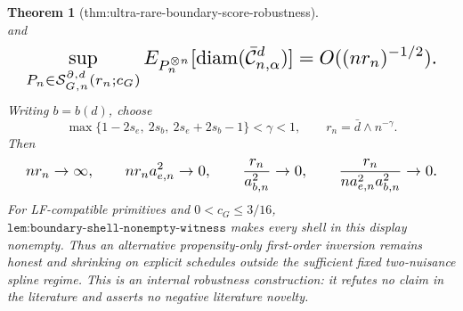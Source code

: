 \documentclass{article}
\newtheorem{theorem}{Theorem}
\begin{document}
\begin{theorem}[thm:ultra-rare-boundary-score-robustness]
\[\]
and
\[
\makebox[\linewidth][c]{\resizebox{0.98\linewidth}{!}{\par\noindent \makebox[\linewidth][c]{\resizebox{0.98\linewidth}{!}{\(\displaystyle \displaystyle \sup_{P_n\in\mathcal S_{G,n}^{\partial,d}(r_n;c_G)}E_{P_n^{\otimes n}}[\operatorname{diam}(\bar{\mathcal C}_{n,\alpha}^d)]=O((nr_n)^{-1/2}).\)}}\par\noindent}}
\]
Writing \(b=b(d)\), choose
\[\max\{1-2s_e,\ 2s_b,\ 2s_e+2s_b-1\}<\gamma<1,\qquad r_n=\bar d\wedge n^{-\gamma}.\]
Then
\[
\makebox[\linewidth][c]{\resizebox{0.98\linewidth}{!}{\par\noindent \makebox[\linewidth][c]{\resizebox{0.98\linewidth}{!}{\(\displaystyle \displaystyle nr_n\to\infty,\qquad nr_na_{e,n}^2\to0,\qquad \frac{r_n}{a_{b,n}^2}\to0,\qquad \frac{r_n}{na_{e,n}^2a_{b,n}^2}\to0.\)}}\par\noindent}}
\]
For LF-compatible primitives and \(0<c_G\le3/16\), \(\texttt{lem:boundary-shell-nonempty-witness}\) makes every shell in this display nonempty. Thus an alternative propensity-only first-order inversion remains honest and shrinking on explicit schedules outside the sufficient fixed two-nuisance spline regime. This is an internal robustness construction: it refutes no claim in the literature and asserts no negative literature novelty.
\end{theorem}
\end{document}
